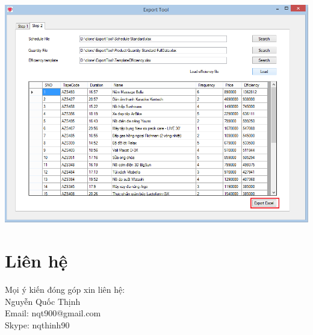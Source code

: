 \documentclass[11pt]{article}
\begin{document}
	\includegraphics[width=140mm]{im8.png}\\
	\section{Liên hệ}
	Mọi ý kiến đóng góp xin liên hệ:\\
	Nguyễn Quốc Thịnh\\
	Email: nqt900@gmail.com\\
	Skype: nqthinh90
	
\end{document}
